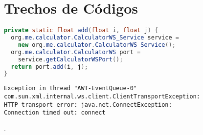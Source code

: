 %

\chapter{Trechos de Códigos}

\begin{lstlisting}[caption=Operação de chamada ao WebService,label=cod:add,language=Java]
private static float add(float i, float j) {
  org.me.calculator.CalculatorWS_Service service = 
    new org.me.calculator.CalculatorWS_Service();
  org.me.calculator.CalculatorWS port = 
    service.getCalculatorWSPort();
  return port.add(i, j);
}
\end{lstlisting}





\begin{lstlisting}[caption=Erro de transporte HTTP,label=cod:httperror]
Exception in thread "AWT-EventQueue-0" 
com.sun.xml.internal.ws.client.ClientTransportException: 
HTTP transport error: java.net.ConnectException: 
Connection timed out: connect
\end{lstlisting}

.
